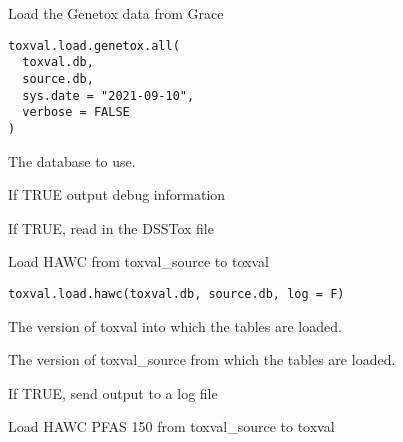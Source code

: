 \documentclass[letterpaper]{book}
\begin{document}
%
\begin{Description}\relax
Load the Genetox data from Grace
\end{Description}
%
\begin{Usage}
\begin{verbatim}
toxval.load.genetox.all(
  toxval.db,
  source.db,
  sys.date = "2021-09-10",
  verbose = FALSE
)
\end{verbatim}
\end{Usage}
%
\begin{Arguments}
\begin{ldescription}
\item[\code{toxval.db}] The database to use.

\item[\code{verbose}] If TRUE output debug information

\item[\code{do.read}] If TRUE, read in the DSSTox file
\end{ldescription}
\end{Arguments}
%
\begin{Description}\relax
Load HAWC from toxval\_source to toxval
\end{Description}
%
\begin{Usage}
\begin{verbatim}
toxval.load.hawc(toxval.db, source.db, log = F)
\end{verbatim}
\end{Usage}
%
\begin{Arguments}
\begin{ldescription}
\item[\code{toxval.db}] The version of toxval into which the tables are loaded.

\item[\code{source.db}] The version of toxval\_source from which the tables are loaded.

\item[\code{log}] If TRUE, send output to a log file
\end{ldescription}
\end{Arguments}
%
\begin{Description}\relax
Load HAWC PFAS 150 from toxval\_source to toxval
\end{Description}
\end{document}

